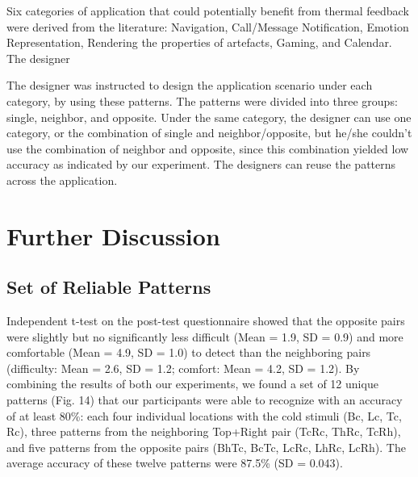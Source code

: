 \documentclass[preprint,12pt]{elsarticle}
\begin{document}
Six categories of application that could potentially benefit from thermal feedback were derived from the literature: Navigation, Call/Message Notification, Emotion Representation, Rendering the properties of artefacts, Gaming, and Calendar. The designer

The designer was instructed to design the application scenario under each category, by using these patterns. The patterns were divided into three groups: single, neighbor, and opposite. Under the same category, the designer can use one category, or the combination of single and neighbor/opposite, but he/she couldn't use the combination of neighbor and opposite, since this combination yielded low accuracy as indicated by our experiment. The designers can reuse the patterns across the application.

\section{Further Discussion}
\subsection{Set of Reliable Patterns}
Independent t-test on the post-test questionnaire showed that the opposite pairs were slightly but no significantly less difficult (Mean = 1.9, SD = 0.9) and more comfortable (Mean = 4.9, SD = 1.0) to detect than the neighboring pairs (difficulty: Mean = 2.6, SD = 1.2; comfort: Mean = 4.2, SD = 1.2). By combining the results of both our experiments, we found a set of 12 unique patterns (Fig. 14) that our participants were able to recognize with an accuracy of at least 80\%: each four individual locations with the cold stimuli (Bc, Lc, Tc, Rc), three patterns from the neighboring Top+Right pair (TcRc, ThRc, TcRh), and five patterns from the opposite pairs (BhTc, BcTc, LcRc, LhRc, LcRh). The average accuracy of these twelve patterns were 87.5\% (SD = 0.043).
\end{document}
